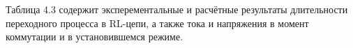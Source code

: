 Таблица 4.3 содержит эксперементальные и расчётные результаты длительности переходного процесса в RL-цепи, а также тока и напряжения в момент коммутации и в установившемся режиме.

\begin{table}[h]
	\centering
	\caption{Результаты измерений и расчётов для RC-цепи}
\end{table}

